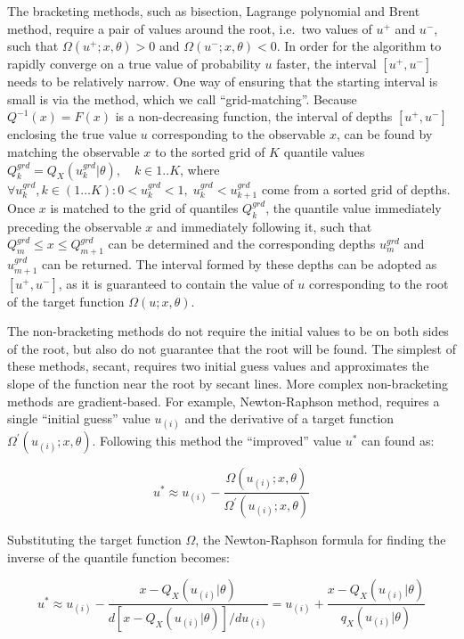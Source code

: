 \documentclass[
  12pt,
]{article}
\begin{document}
The bracketing methods, such as bisection, Lagrange polynomial and Brent method, require a pair of values around the root, i.e.~two values of \(u^+\) and \(u^-\), such that \(\Omega(u^+;x,\theta)>0\) and \(\Omega(u^-;x,\theta)<0\). In order for the algorithm to rapidly converge on a true value of probability \(u\) faster, the interval \([u^+, u^-]\) needs to be relatively narrow. One way of ensuring that the starting interval is small is via the method, which we call ``grid-matching''. Because \(Q^{-1}(x)=F(x)\) is a non-decreasing function, the interval of depths \([u^+, u^-]\) enclosing the true value \(u\) corresponding to the observable \(x\), can be found by matching the observable \(x\) to the sorted grid of \(K\) quantile values \(Q^{grd}_k=Q_X(u^{grd}_k|\theta), \quad k \in 1..K\), where \(\forall u^{grd}_k, k \in (1\dots K): 0<u^{grd}_k<1, \; u^{grd}_k<u^{grd}_{k+1}\) come from a sorted grid of depths. Once \(x\) is matched to the grid of quantiles \(Q^{grd}_k\), the quantile value immediately preceding the observable \(x\) and immediately following it, such that \(Q^{grd}_{m} \leq x \leq Q^{grd}_{m+1}\) can be determined and the corresponding depths \(u^{grd}_m\) and \(u^{grd}_{m+1}\) can be returned. The interval formed by these depths can be adopted as \([u^+, u^-]\), as it is guaranteed to contain the value of \(u\) corresponding to the root of the target function \(\Omega(u;x,\theta)\).

The non-bracketing methods do not require the initial values to be on both sides of the root, but also do not guarantee that the root will be found. The simplest of these methods, secant, requires two initial guess values and approximates the slope of the function near the root by secant lines. More complex non-bracketing methods are gradient-based. For example, Newton-Raphson method, requires a single ``initial guess'' value \(u_{(i)}\) and the derivative of a target function \(\Omega^\prime(u_{(i)};x,\theta)\). Following this method the ``improved'' value \(u^*\) can found as:

\[
u^*\approx u_{(i)} -\frac{\Omega(u_{(i)};x,\theta)}{\Omega^\prime(u_{(i)};x,\theta)}
\]

Substituting the target function \(\Omega\), the Newton-Raphson formula for finding the inverse of the quantile function becomes:

\[
u^*\approx u_{(i)}-\frac{x-Q_X(u_{(i)}|\theta)}{d[x-Q_X(u_{(i)}|\theta)]/du_{(i)}}= u_{(i)}+\frac{x-Q_X(u_{(i)}|\theta)}{q_X(u_{(i)}|\theta)}
\]
\end{document}
